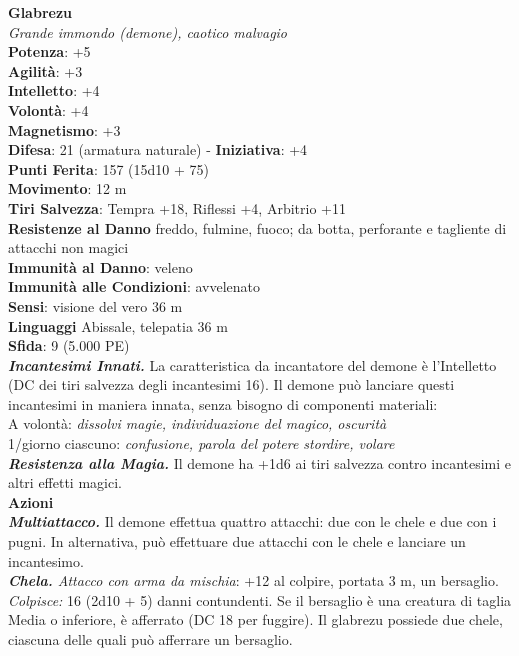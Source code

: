 \begin{multicols}{2}
\medskip\textbf{Glabrezu}\\
\emph{Grande immondo (demone), caotico malvagio}\\
\textbf{Potenza}: +5\\
\textbf{Agilità}: +3\\
\textbf{Intelletto}: +4\\
\textbf{Volontà}: +4\\
\textbf{Magnetismo}: +3\\
\textbf{Difesa}: 21 (armatura naturale) - \textbf{Iniziativa}: +4\\
\textbf{Punti Ferita}: 157 (15d10 + 75)\\
\textbf{Movimento}: 12 m\\
\textbf{Tiri Salvezza}: Tempra +18, Riflessi +4, Arbitrio +11\\
\textbf{Resistenze al Danno} freddo, fulmine, fuoco; da botta, perforante e tagliente di attacchi non magici\\
\textbf{Immunità al Danno}: veleno\\
\textbf{Immunità alle Condizioni}: avvelenato\\
\textbf{Sensi}: visione del vero 36 m\\
\textbf{Linguaggi} Abissale, telepatia 36 m \\
\textbf{Sfida}: 9 (5.000 PE)\smallskip\\
\emph{\textbf{Incantesimi Innati.}} La caratteristica da incantatore del demone è l'Intelletto (DC dei tiri salvezza degli incantesimi 16). Il demone può lanciare questi incantesimi in maniera innata, senza bisogno di componenti materiali:\\
A volontà: \emph{dissolvi magie, individuazione del magico, oscurità}\\
1/giorno ciascuno: \emph{confusione, parola del potere stordire, volare}\\
\emph{\textbf{Resistenza alla Magia.}} Il demone ha +1d6 ai tiri salvezza contro  incantesimi e altri effetti magici. \\
\smallskip\textbf{Azioni}\\
\emph{\textbf{Multiattacco.}} Il demone effettua quattro attacchi: due con le chele e due con i pugni. In alternativa, può effettuare due attacchi con le chele e lanciare un incantesimo.\\
\emph{\textbf{Chela.} Attacco con arma da mischia}: +12 al colpire, portata 3 m, un bersaglio.\\
\emph{Colpisce:} 16 (2d10 + 5) danni contundenti. Se il bersaglio è una creatura di taglia Media o inferiore, è afferrato (DC  18 per fuggire). Il glabrezu possiede due chele, ciascuna delle quali può afferrare un bersaglio.\\

\end{multicols}
